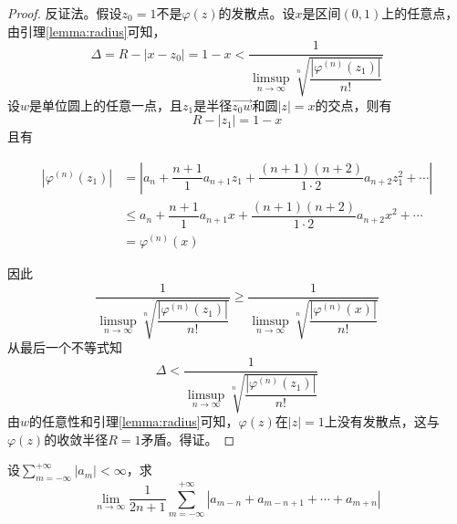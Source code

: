 \begin{proof}

    反证法。假设$z_0 = 1$不是$\varphi(z)$的发散点。设$x$是区间$(0,1)$上的任意点，由引理\ref{lemma:radius}可知，
    $$\Delta = R - |x - z_0| = 1 - x < \dfrac{1}{\limsup\limits_{n \to \infty}{\sqrt[n]{\dfrac{|\varphi^{(n)}(z_1)|}{n!}}}}$$
    设$w$是单位圆上的任意一点，且$z_1$是半径$\vec{z_0w}$和圆$|z| = x$的交点，则有
    $$R - |z_1| = 1 - x$$
    且有
    
    \begin{align*}
        |\varphi^{(n)}(z_1)| & = \left| a_n + \dfrac{n + 1}{1} a_{n + 1}z_1 + \dfrac{(n + 1)(n + 2)}{1 \cdot 2}a_{n + 2}z_1^2 + \cdots \right| \\
        & \leq a_n + \dfrac{n + 1}{1} a_{n + 1}x + \dfrac{(n + 1)(n + 2)}{1 \cdot 2}a_{n + 2}x^2 + \cdots \\
        & = \varphi^{(n)}(x)
    \end{align*}

    因此
    $$\dfrac{1}{\limsup\limits_{n \to \infty}{\sqrt[n]{\dfrac{|\varphi^{(n)}(z_1)|}{n!}}}} \geq \dfrac{1}{\limsup\limits_{n \to \infty}{\sqrt[n]{\dfrac{|\varphi^{(n)}(x)|}{n!}}}}$$
    从最后一个不等式知
    $$\Delta < \dfrac{1}{\limsup\limits_{n \to \infty}{\sqrt[n]{\dfrac{|\varphi^{(n)}(z_1)|}{n!}}}}$$
    由$w$的任意性和引理\ref{lemma:radius}可知，$\varphi(z)$在$|z| = 1$上没有发散点，这与$\varphi(z)$的收敛半径$R = 1$矛盾。得证。

\end{proof}

\begin{proposition}

    设$\sum\limits_{m = -\infty}^{+\infty}{|a_m|} < \infty$，求
    $$\lim\limits_{n \to \infty}{\dfrac{1}{2n + 1}\sum\limits_{m = -\infty}^{+\infty}{|a_{m -n} + a_{m - n + 1} + \cdots + a_{m + n}|}}$$

\end{proposition}

